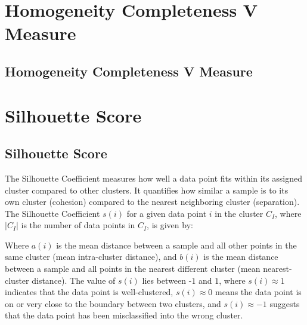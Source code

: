 \section{Homogeneity Completeness V Measure}
\subsection{Homogeneity Completeness V Measure}

\clearpage
\thispagestyle{clusteringstyle}
\section{Silhouette Score}
\subsection{Silhouette Score}

The Silhouette Coefficient measures how well a data point fits within its assigned cluster compared to other clusters. 
It quantifies how similar a sample is to its own cluster (cohesion) compared to the nearest neighboring cluster (separation).
The Silhouette Coefficient $s(i)$ for a given data point $i$ in the cluster $C_I$, where $|C_I|$ is the number of data points in $C_I$, is given by:

\begin{center}
\end{center}

Where  $a(i)$ is the mean distance between a sample and all other points in the same cluster (mean intra-cluster distance), 
and  $b(i)$ is the mean distance between a sample and all points in the nearest different cluster (mean nearest-cluster distance). 
The value of  $s(i)$ lies between -$1$ and  $1$, where  $s(i) \approx 1$ indicates that the data point is well-clustered, 
 $s(i) \approx 0$ means the data point is on or very close to the boundary between two clusters, and  $s(i) \approx -1$ 
suggests that the data point has been misclassified into the wrong cluster.

